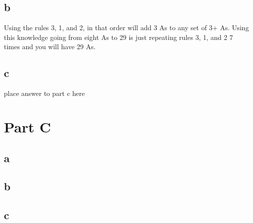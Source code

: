 \documentclass[12pt]{amsart}
\begin{document}
\subsection*{b}
Using the rules 3, 1, and 2, in that order will add 3 As to any set of 3+ As. Using this knowledge going from eight As to 29 is just repeating rules 3, 1, and 2 7 times and you will have 29 As.

\subsection*{c}
place answer to part c here

\newpage

\section*{Part C}
\subsection*{a}

\subsection*{b}

\subsection*{c}
\end{document}
